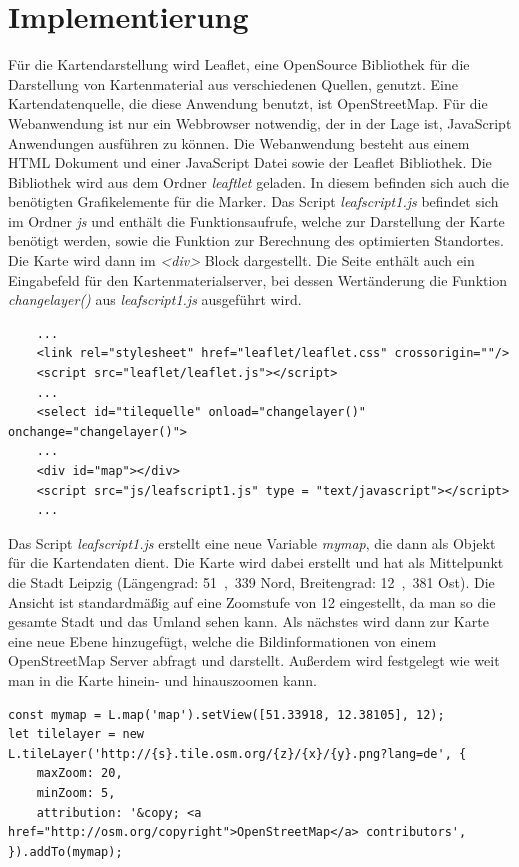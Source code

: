 \documentclass[a4paper, 12pt]{scrreprt}
\begin{document}
\chapter{Implementierung}
Für die Kartendarstellung wird Leaflet\cite{crickard2014leaflet}, eine OpenSource Bibliothek für die Darstellung von Kartenmaterial aus verschiedenen Quellen, genutzt.
Eine Kartendatenquelle, die diese Anwendung benutzt, ist OpenStreetMap.
Für die Webanwendung ist nur ein Webbrowser notwendig, der in der Lage ist, JavaScript Anwendungen ausführen zu können.
Die Webanwendung besteht aus einem HTML Dokument und einer JavaScript Datei sowie der Leaflet Bibliothek.
Die Bibliothek wird aus dem Ordner \textit{leaftlet} geladen.
In diesem befinden sich auch die benötigten Grafikelemente für die Marker.
Das Script \textit{leafscript1.js} befindet sich im Ordner \textit{js} und enthält die Funktionsaufrufe, welche zur Darstellung der Karte benötigt werden, sowie die Funktion zur Berechnung des optimierten Standortes.
Die Karte wird dann im \textit{<div>} Block dargestellt.
Die Seite enthält auch ein Eingabefeld für den Kartenmaterialserver, bei dessen Wertänderung die Funktion \textit{changelayer()} aus \textit{leafscript1.js} ausgeführt wird.
\begin{lstlisting}
	...
	<link rel="stylesheet" href="leaflet/leaflet.css" crossorigin=""/>
	<script src="leaflet/leaflet.js"></script>
	...
	<select id="tilequelle" onload="changelayer()" onchange="changelayer()">
	...
	<div id="map"></div>
	<script src="js/leafscript1.js" type = "text/javascript"></script>
	...
\end{lstlisting}
Das Script \textit{leafscript1.js} erstellt eine neue Variable \textit{mymap}, die dann als Objekt für die Kartendaten dient.
Die Karte wird dabei erstellt und hat als Mittelpunkt die Stadt Leipzig (Längengrad: \si{51{,}339}{\textdegree}  Nord, Breitengrad: \si{12{,}381}{\textdegree}  Ost). Die Ansicht ist standardmäßig auf eine Zoomstufe von 12 eingestellt, da man so die gesamte Stadt und das Umland sehen kann.
Als nächstes wird dann zur Karte eine neue Ebene hinzugefügt, welche die Bildinformationen von einem OpenStreetMap Server abfragt und darstellt.
Außerdem wird festgelegt wie weit man in die Karte hinein- und hinauszoomen kann.
\lstset{language=Java}
\begin{lstlisting}
const mymap = L.map('map').setView([51.33918, 12.38105], 12);
let tilelayer = new L.tileLayer('http://{s}.tile.osm.org/{z}/{x}/{y}.png?lang=de', {
	maxZoom: 20,
	minZoom: 5,
	attribution: '&copy; <a href="http://osm.org/copyright">OpenStreetMap</a> contributors',
}).addTo(mymap);
\end{lstlisting}
\end{document}
